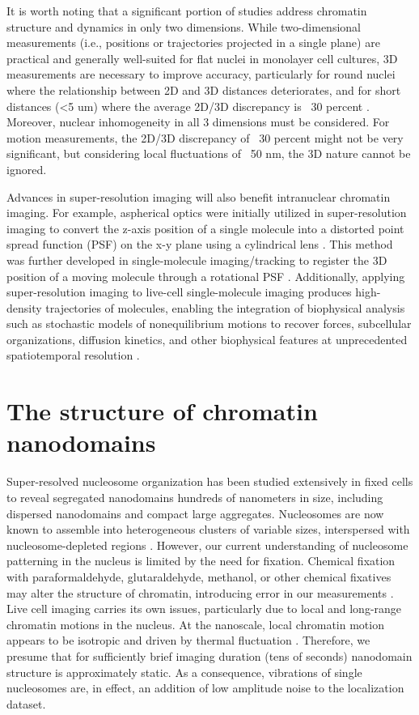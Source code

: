 It is worth noting that a significant portion of studies address chromatin structure and dynamics in only two dimensions. While two-dimensional measurements (i.e., positions or trajectories projected in a single plane) are practical and generally well-suited for flat nuclei in monolayer cell cultures, 3D measurements are necessary to improve accuracy, particularly for round nuclei where the relationship between 2D and 3D distances deteriorates, and for short distances (<5 um) where the average 2D/3D discrepancy is ~30 percent \parencite{Finn2017}. Moreover, nuclear inhomogeneity in all 3 dimensions must be considered. For motion measurements, the 2D/3D discrepancy of ~30 percent might not be very significant, but considering local fluctuations of ~50 nm, the 3D nature cannot be ignored.

Advances in super-resolution imaging will also benefit intranuclear chromatin imaging. For example, aspherical optics were initially utilized in super-resolution imaging to convert the z-axis position of a single molecule into a distorted point spread function (PSF) on the x-y plane using a cylindrical lens \parencite{Huang2008}. This method was further developed in single-molecule imaging/tracking to register the 3D position of a moving molecule through a rotational PSF \parencite{Greengard2006,Pavani2009,Badieirostami2010,Thompson2010}. Additionally, applying super-resolution imaging to live-cell single-molecule imaging produces high-density trajectories of molecules, enabling the integration of biophysical analysis such as stochastic models of nonequilibrium motions to recover forces, subcellular organizations, diffusion kinetics, and other biophysical features at unprecedented spatiotemporal resolution \parencite{Hoze2012,Holcman2015,Hoze2015}.


\section{The structure of chromatin nanodomains}

Super-resolved nucleosome organization has been studied extensively in fixed cells to reveal segregated
nanodomains hundreds of nanometers in size, including dispersed nanodomains and compact large aggregates. Nucleosomes are now known to assemble into heterogeneous clusters of variable sizes, interspersed with nucleosome-depleted regions \parencite{Ricci2015}. However, our current understanding of nucleosome patterning in the nucleus is limited by the need for fixation. Chemical fixation with paraformaldehyde, glutaraldehyde, methanol, or other chemical fixatives may alter the structure of chromatin, introducing error in our measurements \parencite{Maeshima2020}. Live cell imaging carries its own issues, particularly due to local and long-range chromatin motions in the nucleus. At the nanoscale, local chromatin motion appears to be isotropic and driven by thermal fluctuation \parencite{Maeshima2020}. Therefore, we presume that for sufficiently brief imaging duration (tens of seconds) nanodomain structure is approximately static. As a consequence, vibrations of single nucleosomes are, in effect, an addition of low amplitude noise to the localization dataset. 

